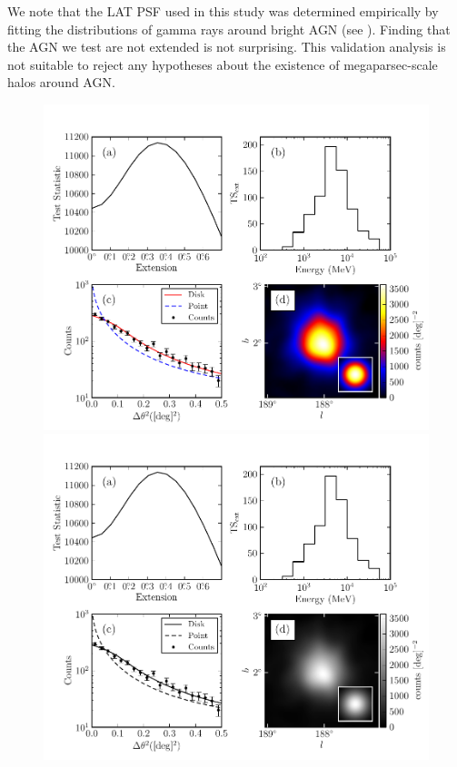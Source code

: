 We note that the LAT PSF used in this study was determined
empirically by fitting the distributions of gamma rays around bright AGN (see
). Finding that the AGN we
test are not extended is not surprising.  This validation analysis is
not suitable to reject any hypotheses about the existence of megaparsec-scale
halos around AGN.





\clearpage
\begin{figure}
    \ifcolorfigure
    \includegraphics{ic443_plots/four_plots_ic443_color.pdf}
    \else
    \includegraphics{ic443_plots/four_plots_ic443_bw.pdf}

\end{figure}
